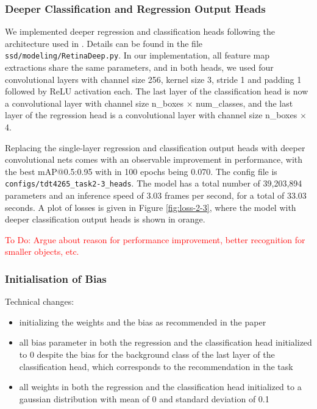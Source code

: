 \documentclass{article}
\begin{document}
\subsubsection*{Deeper Classification and Regression Output Heads}
 We implemented deeper regression and classification heads following the architecture used in \cite{lin2017focal}. Details can be found in the file \texttt{ssd/modeling/RetinaDeep.py}. In our implementation, all feature map extractions share the same parameters, and in both heads, we used four convolutional layers with channel size 256, kernel size 3, stride 1 and padding 1 followed by ReLU activation each. The last layer of the classification head is now a convolutional layer with channel size n\_boxes $\times$ num\_classes, and the last layer of the regression head is a convolutional layer with channel size n\_boxes $\times$ 4.
 
Replacing the single-layer regression and classification output heads with deeper convolutional nets comes with an observable improvement in performance, with the best mAP@0.5:0.95 with in 100 epochs being 0.070. The config file is \texttt{configs/tdt4265\_task2-3\_heads}. The model has a total number of 39,203,894 parameters and an inference speed of 3.03 frames per second, for a total of 33.03 seconds. A plot of losses is given in Figure \ref{fig:loss-2-3}, where the model with deeper classification output heads is shown in orange.

\textcolor{red}{To Do: Argue about reason for performance improvement, better recognition for smaller objects, etc.}

\subsubsection*{Initialisation of Bias}

Technical changes:
\begin{itemize}
    \item initializing the weights and the bias as recommended in the paper \cite{lin2017focal}
    \item all bias parameter in both the regression and the classification head initialized to 0 despite the bias for the background class of the last layer of the classification head, which corresponds to the recommendation in the task
    \item all weights in both the regression and the classification head initialized to a gaussian distribution with mean of 0 and standard deviation of 0.1
\end{itemize}
\end{document}
